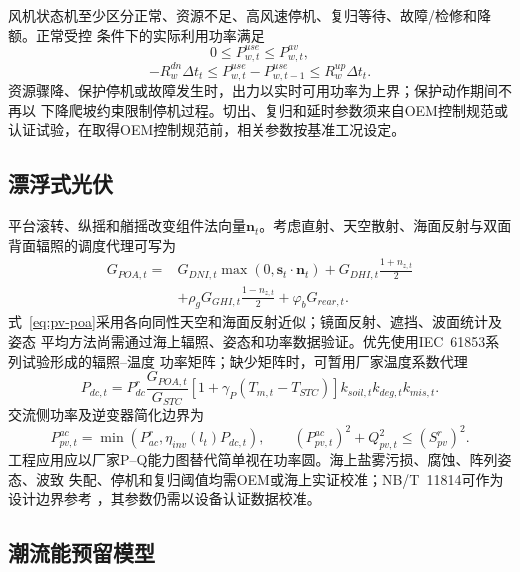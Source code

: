 风机状态机至少区分正常、资源不足、高风速停机、复归等待、故障/检修和降额。正常受控
条件下的实际利用功率满足
\begin{equation}
0\le P_{w,t}^{use}\le P_{w,t}^{av},
\label{eq:wind-available}
\end{equation}
\begin{equation}
-R_w^{dn}\Delta t_t\le P_{w,t}^{use}-P_{w,t-1}^{use}
\le R_w^{up}\Delta t_t.
\label{eq:wind-ramp}
\end{equation}
资源骤降、保护停机或故障发生时，出力以实时可用功率为上界；保护动作期间不再以
下降爬坡约束限制停机过程。切出、复归和延时参数须来自OEM控制规范或认证试验，在取得OEM控制规范前，相关参数按基准工况设定。

\subsection{漂浮式光伏}

平台滚转、纵摇和艏摇改变组件法向量$\bm n_t$。考虑直射、天空散射、海面反射与双面
背面辐照的调度代理可写为
\begin{equation}
\begin{aligned}
G_{POA,t}={}&G_{DNI,t}\max(0,\bm s_t\!\cdot\!\bm n_t)
+G_{DHI,t}\frac{1+n_{z,t}}{2}\\
&+\rho_gG_{GHI,t}\frac{1-n_{z,t}}{2}
+\varphi_bG_{rear,t}.
\end{aligned}
\label{eq:pv-poa}
\end{equation}
式~\eqref{eq:pv-poa}采用各向同性天空和海面反射近似；镜面反射、遮挡、波面统计及姿态
平均方法尚需通过海上辐照、姿态和功率数据验证。优先使用IEC~61853系列试验形成的辐照--温度
功率矩阵\cite{iec61853}；缺少矩阵时，可暂用厂家温度系数代理
\begin{equation}
P_{dc,t}=P_{dc}^{r}\frac{G_{POA,t}}{G_{STC}}
\left[1+\gamma_P(T_{m,t}-T_{STC})\right]
k_{soil,t}k_{deg,t}k_{mis,t}.
\label{eq:pv-dc}
\end{equation}
交流侧功率及逆变器简化边界为
\begin{equation}
P_{pv,t}^{ac}=\min\!\left(P_{ac}^{r},\eta_{inv}(l_t)P_{dc,t}\right),
\qquad (P_{pv,t}^{ac})^2+Q_{pv,t}^2\le(S_{pv}^{r})^2.
\label{eq:pv-ac}
\end{equation}
工程应用应以厂家P--Q能力图替代简单视在功率圆。海上盐雾污损、腐蚀、阵列姿态、波致
失配、停机和复归阈值均需OEM或海上实证校准；NB/T~11814可作为设计边界参考
\cite{nbt11814}，其参数仍需以设备认证数据校准。

\subsection{潮流能预留模型}

